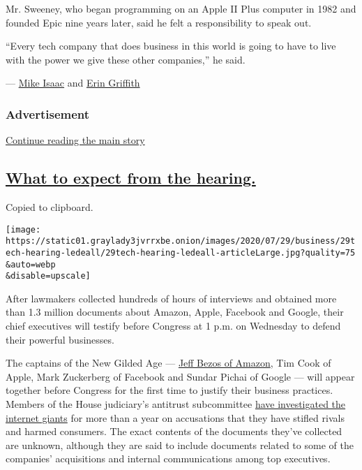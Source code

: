 Mr. Sweeney, who began programming on an Apple II Plus computer in 1982
and founded Epic nine years later, said he felt a responsibility to
speak out.

``Every tech company that does business in this world is going to have
to live with the power we give these other companies,'' he said.

--- \href{https://www.nytimes3xbfgragh.onion/by/mike-isaac}{Mike Isaac}
and \href{https://www.nytimes3xbfgragh.onion/by/erin-griffith}{Erin
Griffith}

\hypertarget{advertisement-4}{%
\subsubsection{Advertisement}\label{advertisement-4}}

\protect\hyperlink{after-dfp-ad-mid2}{Continue reading the main story}

\hypertarget{what-to-expect-from-the-hearing}{%
\subsection{\texorpdfstring{\protect\hyperlink{what-to-expect-from-the-hearing}{What
to expect from the
hearing.}}{What to expect from the hearing.}}\label{what-to-expect-from-the-hearing}}

Copied to clipboard.

\texttt{[image: https://static01.graylady3jvrrxbe.onion/images/2020/07/29/business/29tech-hearing-ledeall/29tech-hearing-ledeall-articleLarge.jpg?quality=75\\\&auto=webp\\\&disable=upscale]}

After lawmakers collected hundreds of hours of interviews and obtained
more than 1.3 million documents about Amazon, Apple, Facebook and
Google, their chief executives will testify before Congress at 1 p.m. on
Wednesday to defend their powerful businesses.

The captains of the New Gilded Age ---
\href{https://www.nytimes3xbfgragh.onion/2020/07/27/business/jeff-bezos-amazon-congress.html}{Jeff
Bezos of Amazon}, Tim Cook of Apple, Mark Zuckerberg of Facebook and
Sundar Pichai of Google --- will appear together before Congress for the
first time to justify their business practices. Members of the House
judiciary's antitrust subcommittee
\href{https://www.nytimes3xbfgragh.onion/2019/06/11/technology/antitrust-hearing.html}{have
investigated the internet giants} for more than a year on accusations
that they have stifled rivals and harmed consumers. The exact contents
of the documents they've collected are unknown, although they are said
to include documents related to some of the companies' acquisitions and
internal communications among top executives.

